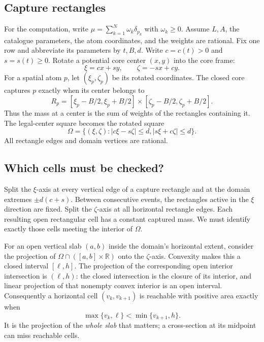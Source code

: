 \documentclass[11pt]{article}
\newcommand{\R}{\mathbb R}
\newcommand{\abs}[1]{\left|#1\right|}
\begin{document}
\subsection{Capture rectangles}

For the computation, write $\mu=\sum_{k=1}^N\omega_k\delta_{p_k}$ with
$\omega_k\ge0$. Assume $L,A$, the catalogue parameters, the atom coordinates,
and the weights are rational.
Fix one row and abbreviate its parameters by $t,B,d$. Write $c=c(t)>0$ and
$s=s(t)\ge0$. Rotate a potential core center $(x,y)$ into the core frame:
\[
  \xi=cx+sy,\qquad \zeta=-sx+cy.
\]
For a spatial atom $p$, let $(\xi_p,\zeta_p)$ be its rotated coordinates.
The closed core captures $p$ exactly when its center belongs to
\begin{equation}\label{eq:capture}
  R_p=[\xi_p-B/2,\xi_p+B/2]\times
      [\zeta_p-B/2,\zeta_p+B/2].
\end{equation}
Thus the mass at a center is the sum of weights of the rectangles containing
it. The legal-center square becomes the rotated square
\begin{equation}\label{eq:rotated-domain}
  \Omega=\{(\xi,\zeta):\abs{c\xi-s\zeta}\le d,
                             \abs{s\xi+c\zeta}\le d\}.
\end{equation}
All rectangle edges and domain vertices are rational.

\subsection{Which cells must be checked?}

Split the $\xi$-axis at every vertical edge of a capture rectangle and at the
domain extremes $\pm d(c+s)$. Between consecutive events, the rectangles
active in the $\xi$ direction are fixed. Split the $\zeta$-axis at all
horizontal rectangle edges. Each resulting open rectangular cell has a
constant captured mass. We must identify exactly those cells meeting the
interior of $\Omega$.

For an open vertical slab $(a,b)$ inside the domain's horizontal extent,
consider the projection of
$\Omega\cap([a,b]\times\R)$ onto the $\zeta$-axis. Convexity makes this a
closed interval $[\ell,h]$. The projection of the corresponding open
interior intersection is $(\ell,h)$: the closed intersection is the closure
of its interior, and linear projection of that nonempty convex interior is
an open interval. Consequently a horizontal cell $(v_k,v_{k+1})$ is reachable
with positive area exactly when
\begin{equation}\label{eq:reachable}
  \max\{v_k,\ell\}<\min\{v_{k+1},h\}.
\end{equation}
It is the projection of the \emph{whole slab} that matters; a cross-section
at its midpoint can miss reachable cells.
\end{document}
